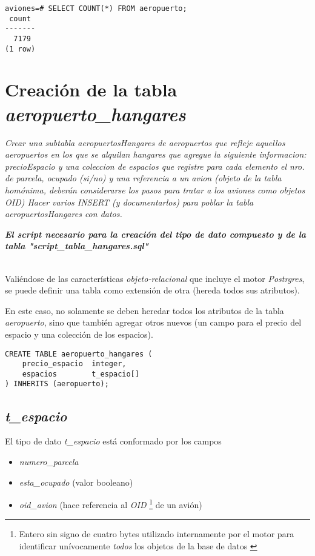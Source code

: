 \vspace*{5mm}
\lstset{style=sql}
\begin{lstlisting}
aviones=# SELECT COUNT(*) FROM aeropuerto;
 count 
-------
  7179
(1 row)
\end{lstlisting}

\section{Creación de la tabla \emph{aeropuerto\_hangares}}

\emph{Crear una subtabla aeropuertosHangares de aeropuertos que refleje aquellos aeropuertos en los que se alquilan hangares que agregue la siguiente informacion: precioEspacio y una coleccion de espacios que registre para cada elemento el nro. de parcela, ocupado (si/no) y una referencia a un avion (objeto de la tabla homónima, deberán considerarse los pasos para tratar a los aviones como objetos OID) Hacer varios INSERT (y documentarlos) para poblar la tabla aeropuertosHangares con datos.} 

\emph{\textbf{El script necesario para la creación del tipo de dato compuesto y de la tabla "script\_tabla\_hangares.sql"}} 

~\\


Valiéndose de las características \emph{objeto-relacional} que incluye el motor \emph{Postrgres}, se puede definir una tabla como extensión de otra (hereda todos sus atributos).

En este caso, no solamente se deben heredar todos los atributos de la tabla \emph{aeropuerto}, sino que también agregar otros nuevos (un campo para el precio del espacio y una colección de los espacios). 

\vspace*{5mm}
\lstset{style=sql}
\begin{lstlisting}
CREATE TABLE aeropuerto_hangares (
    precio_espacio  integer,
    espacios        t_espacio[]
) INHERITS (aeropuerto);
\end{lstlisting}

\subsection{\emph{t\_espacio}}

El tipo de dato \emph{t\_espacio} está conformado por los campos
\begin{itemize}
    \item \emph{numero\_parcela} 
    \item \emph{esta\_ocupado} (valor booleano) 
    \item \emph{oid\_avion} (hace referencia al \emph{OID} \footnote{Entero sin signo de cuatro bytes utilizado internamente por el motor para identificar unívocamente \emph{todos} los objetos de la base de datos \cite{oid}} de un avión)
\end{itemize}

